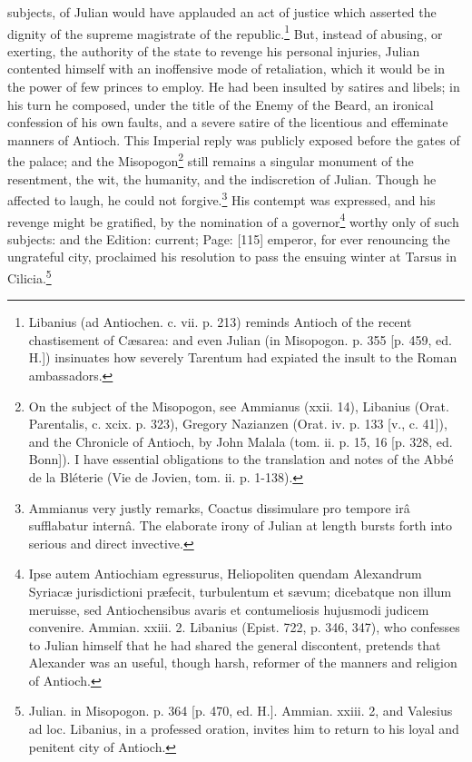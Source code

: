 subjects, of Julian would have applauded an act of justice which asserted the dignity of the supreme magistrate of the republic.\footnote{Libanius (ad Antiochen. c. vii. p. 213) reminds Antioch of the recent chastisement of Cæsarea: and even Julian (in Misopogon. p. 355 [p. 459, ed. H.]) insinuates how severely Tarentum had expiated the insult to the Roman ambassadors.} But, instead of abusing, or exerting, the authority of the state to revenge his personal injuries, Julian contented himself with an inoffensive mode of retaliation, which it would be in the power of few princes to employ. He had been insulted by satires and libels; in his turn he composed, under the title of the Enemy of the Beard, an ironical confession of his own faults, and a severe satire of the licentious and effeminate manners of Antioch. This Imperial reply was publicly exposed before the gates of the palace; and the Misopogon\footnote{On the subject of the Misopogon, see Ammianus (xxii. 14), Libanius (Orat. Parentalis, c. xcix. p. 323), Gregory Nazianzen (Orat. iv. p. 133 [v., c. 41]), and the Chronicle of Antioch, by John Malala (tom. ii. p. 15, 16 [p. 328, ed. Bonn]). I have essential obligations to the translation and notes of the Abbé de la Bléterie (Vie de Jovien, tom. ii. p. 1-138).} still remains a singular monument of the resentment, the wit, the humanity, and the indiscretion of Julian. Though he affected to laugh, he could not forgive.\footnote{Ammianus very justly remarks, Coactus dissimulare pro tempore irâ sufflabatur internâ. The elaborate irony of Julian at length bursts forth into serious and direct invective.} His contempt was expressed, and his revenge might be gratified, by the nomination of a governor\footnote{Ipse autem Antiochiam egressurus, Heliopoliten quendam Alexandrum Syriacæ jurisdictioni præfecit, turbulentum et sævum; dicebatque non illum meruisse, sed Antiochensibus avaris et contumeliosis hujusmodi judicem convenire. Ammian. xxiii. 2. Libanius (Epist. 722, p. 346, 347), who confesses to Julian himself that he had shared the general discontent, pretends that Alexander was an useful, though harsh, reformer of the manners and religion of Antioch.} worthy only of such subjects: and the Edition: current; Page: [115] emperor, for ever renouncing the ungrateful city, proclaimed his resolution to pass the ensuing winter at Tarsus in Cilicia.\footnote{Julian. in Misopogon. p. 364 [p. 470, ed. H.]. Ammian. xxiii. 2, and Valesius ad loc. Libanius, in a professed oration, invites him to return to his loyal and penitent city of Antioch.}


